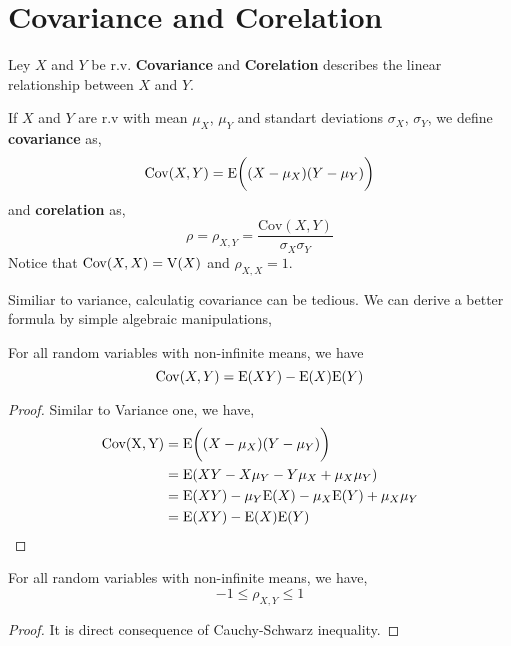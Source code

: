 \section{Covariance and Corelation}
Ley $X$ and $Y$ be r.v.  \textbf{ Covariance} and \textbf{ Corelation} describes the linear relationship between $X$ and $Y$.
\begin{definition}
    If $X$ and $Y$ are r.v with mean $\mu_X$, $\mu_Y$ and standart deviations $\sigma_X$, $\sigma_Y$, we define \textbf{covariance} as,
    \[\mathrm{Cov}(X,Y) = {\operatorname{E}} \bigg((X- \mu_X)(Y - \mu_Y) \bigg)\]
    and \textbf{corelation} as,
    \[\rho = \rho_{X,Y} = \frac{\mathrm{Cov}(X,Y)}{\sigma_X\sigma_Y}\]
    Notice that $\mathrm{Cov}(X,X) = \operatorname{V}(X)$ and $\rho_{X,X} = 1$.
\end{definition}
Similiar to variance, calculatig covariance can be tedious. We can derive a better formula by simple algebraic manipulations,
\begin{theorem}
    For all random variables with non-infinite means, we have
    \[\mathrm{Cov}{(X,Y) = {\operatorname{E}}(XY)-{\operatorname{E}}(X){\operatorname{E}}(Y)}\]
    \begin{proof}
        Similar to Variance one, we have,
        \begin{align*}
                    \mathrm{Cov(X,Y)}  &= {\operatorname{E}} \bigg( (X- \mu_X)(Y - \mu_Y) \bigg)\\
                                        &= {\operatorname{E}} ( XY- X\mu_Y-Y\mu_X+\mu_X\mu_Y ) \\
                                        &= {\operatorname{E}}(XY) - \mu_Y{\operatorname{E}}(X) - \mu_X{\operatorname{E}}(Y) + \mu_X\mu_Y \\ 
                                        &= {\operatorname{E}}(XY) - {\operatorname{E}}(X){\operatorname{E}}(Y)
        \end{align*}
    \end{proof}
\end{theorem}
\begin{theorem}
    For all random variables with non-infinite means, we have,
    \[ -1 \le \rho_{X,Y} \le 1\]
    \begin{proof}
        It is direct consequence of Cauchy-Schwarz inequality.
    \end{proof}
\end{theorem}
